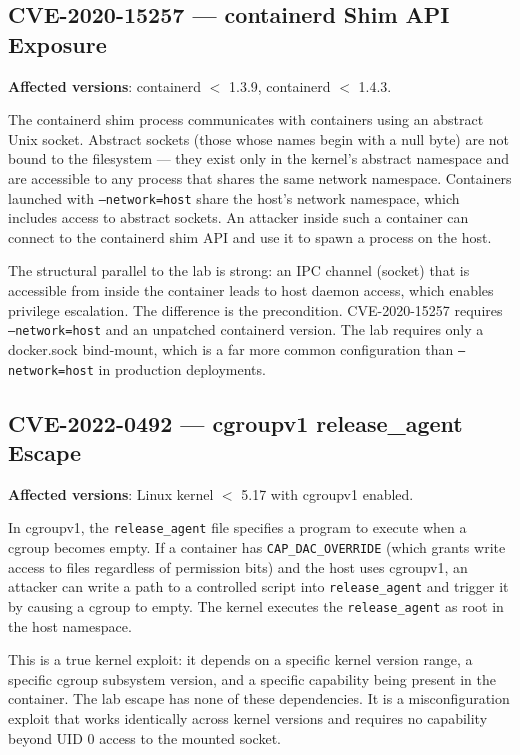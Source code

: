 \subsection{CVE-2020-15257 --- containerd Shim API Exposure}

\textbf{Affected versions}: containerd $<$ 1.3.9, containerd $<$ 1.4.3.

The containerd shim process communicates with containers using an abstract Unix socket. Abstract sockets (those whose names begin with a null byte) are not bound to the filesystem --- they exist only in the kernel's abstract namespace and are accessible to any process that shares the same network namespace. Containers launched with \texttt{--network=host} share the host's network namespace, which includes access to abstract sockets. An attacker inside such a container can connect to the containerd shim API and use it to spawn a process on the host.

The structural parallel to the lab is strong: an IPC channel (socket) that is accessible from inside the container leads to host daemon access, which enables privilege escalation. The difference is the precondition. CVE-2020-15257 requires \texttt{--network=host} and an unpatched containerd version. The lab requires only a docker.sock bind-mount, which is a far more common configuration than \texttt{--network=host} in production deployments.

\subsection{CVE-2022-0492 --- cgroupv1 release\_agent Escape}

\textbf{Affected versions}: Linux kernel $<$ 5.17 with cgroupv1 enabled.

In cgroupv1, the \texttt{release\_agent} file specifies a program to execute when a cgroup becomes empty. If a container has \texttt{CAP\_DAC\_OVERRIDE} (which grants write access to files regardless of permission bits) and the host uses cgroupv1, an attacker can write a path to a controlled script into \texttt{release\_agent} and trigger it by causing a cgroup to empty. The kernel executes the \texttt{release\_agent} as root in the host namespace.

This is a true kernel exploit: it depends on a specific kernel version range, a specific cgroup subsystem version, and a specific capability being present in the container. The lab escape has none of these dependencies. It is a misconfiguration exploit that works identically across kernel versions and requires no capability beyond UID 0 access to the mounted socket.

